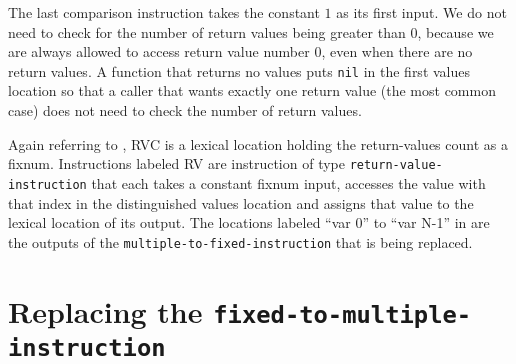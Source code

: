 The last comparison instruction takes the constant $1$ as its first
input.  We do not need to check for the number of return values being
greater than $0$, because we are always allowed to access return value
number $0$, even when there are no return values.  A function that
returns no values puts \texttt{nil} in the first values location so
that a caller that wants exactly one return value (the most common
case) does not need to check the number of return values.

Again referring to , RVC is a lexical
location holding the return-values count as a fixnum.  Instructions
labeled RV are instruction of type \texttt{return-value-instruction}
that each takes a constant fixnum input, accesses the value with that
index in the distinguished values location and assigns that value to
the lexical location of its output.  The locations labeled ``var 0''
to ``var N-1'' in  are the outputs of the
\texttt{multiple-to-fixed-instruction} that is being replaced.

\section{Replacing the \texttt{fixed-to-multiple-instruction}}
